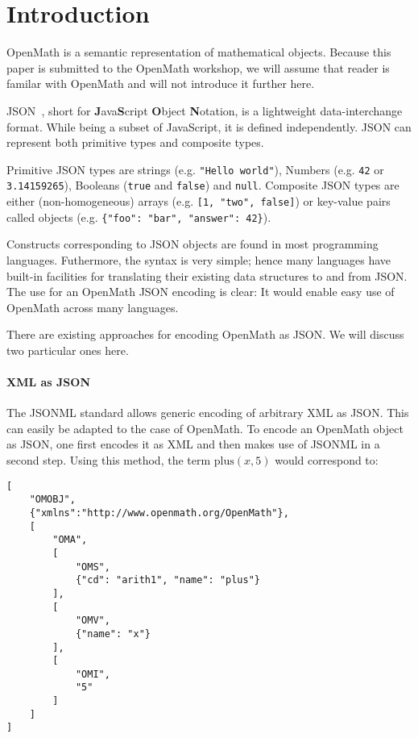 \section{Introduction}

OpenMath \cite{BusCapCar:oms04} is a semantic representation of mathematical objects. 
Because this paper is submitted to the OpenMath workshop, we will assume that reader is familar with OpenMath and will not introduce it further here. 

JSON~\cite{JSON:web}, short for \textbf{J}ava\textbf{S}cript \textbf{O}bject \textbf{N}otation, is a lightweight data-interchange format. 
While being a subset of JavaScript, it is defined independently. 
JSON can represent both primitive types and composite types.

Primitive JSON types are strings (e.g. \lstinline{"Hello world"}), Numbers (e.g. \lstinline{42} or \lstinline{3.14159265}), Booleans (\lstinline{true} and \lstinline{false}) and \lstinline{null}. 
Composite JSON types are either (non-homogeneous) arrays (e.g. \lstinline{[1, "two", false]}) or key-value pairs called objects (e.g. \lstinline|{"foo": "bar", "answer": 42}|). 

Constructs corresponding to JSON objects are found in most programming languages. 
Futhermore, the syntax is very simple; hence many languages have built-in facilities for translating their existing data structures to and from JSON. 
The use for an OpenMath JSON encoding is clear: It would enable easy use of OpenMath across many languages. 

There are existing approaches for encoding OpenMath as JSON. 
We will discuss two particular ones here. 

\paragraph{XML as JSON}
The JSONML standard\cite{jsonml:webpage} allows generic encoding of arbitrary XML as JSON. 
This can easily be adapted to the case of OpenMath. 
To encode an OpenMath object as JSON, one first encodes it as XML and then makes use of JSONML in a second step. 
Using this method, the term $\mathrm{plus}(x, 5)$ would correspond to: 
\begin{lstlisting}
[
    "OMOBJ",
    {"xmlns":"http://www.openmath.org/OpenMath"},
    [
        "OMA",
        [
            "OMS", 
            {"cd": "arith1", "name": "plus"}
        ],
        [
            "OMV", 
            {"name": "x"}
        ],
        [
            "OMI", 
            "5"
        ]
    ]
]
\end{lstlisting}

